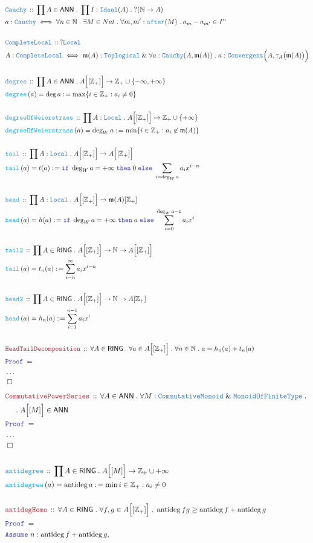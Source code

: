 \documentclass[12pt]{scrartcl}
\newcommand{\TYPE}[1]{\textcolor{NavyBlue}{\mathtt{#1}}}
\newcommand{\FUNC}[1]{\textcolor{Cerulean}{\mathtt{#1}}}
\newcommand{\LOGIC}[1]{\textcolor{Blue}{\mathtt{#1}}}
\newcommand{\THM}[1]{\textcolor{Maroon}{\mathtt{#1}}}
\renewcommand{\.}{\; . \;}
\newcommand{\de}{: \kern 0.1pc =}
\newcommand{\If}{\LOGIC{if} \;}
\newcommand{\Then}{ \; \LOGIC{then} \;}
\newcommand{\Else}{\; \LOGIC{else} \;}
\newcommand{\Act}[1]{\left( #1 \right)}
\newcommand{\Theorem}[2]{& \THM{#1} \, :: \, #2 \\ & \Proof = \\ }
\newcommand{\DeclareType}[2]{& \TYPE{#1} \, :: \, #2 \\}
\newcommand{\DefineType}[3]{& #1 : \TYPE{#2} \iff #3 \\}
\newcommand{\DeclareFunc}[2]{& \FUNC{#1} \, :: \, #2 \\}
\newcommand{\DefineNamedFunc}[4]{&  \FUNC{#1}\Act{#2} = #3 \de #4 \\}
\newcommand{\NewLine}{\\ & \kern 1pc}
\newcommand{\Page}[1]{ \begin{align*} #1 \end{align*}   }
\newcommand{\NoProof}{ & \ldots \\ \EndProof}
\renewcommand{\And}{\; \& \;}
\newcommand{\Int}{\mathbb{Z} }
\newcommand{\Nat}{\mathbb{N} }
\newcommand{\Assume}[2]{& \LOGIC{Assume} \; #1 : #2, \\}
\newcommand{\QED}{\; \square}
\newcommand{\EndProof}{& \QED \\}
\newcommand{\Proof}{\LOGIC{Proof} \; }
\newcommand{\Ideal}{\TYPE{Ideal}}
\newcommand{\MoFT}{\TYPE{MonoidOfFiniteType}}
\newcommand{\RING}{\mathsf{RING}}
\newcommand{\ANN}{\mathsf{ANN}}
\DeclareMathOperator{\antideg}{antideg}
\begin{document}
\Page{
	\DeclareType{Cauchy}{\prod A \in \ANN \. \prod I : \Ideal(A) \.?(\Nat \to A)}
	\DefineType{a}{Cauchy}{\forall n \in \Nat \. \exists M \in Nat \. \forall m,m' : \FUNC{after}(M) \. a_m - a_{m'} \in I^n}
	\\
	\DeclareType{CompleteLocal}{?\TYPE{Local}}
	\DefineType{A}{CompleteLocal}{\mathfrak{m}(A) : \TYPE{Toplogical} 
		\And \forall a : \TYPE{Cauchy}(A,\mathfrak{m}(A)) \. a : \TYPE{Convergent}\Big(A,\tau_A\big(\mathfrak{m}(A)\big)\Big)}
	\\
	\DeclareFunc{degree}{\prod A \in \ANN \. A\Big[[ \Int_+ ]\Big] \to \Int_+ \cup \{-\infty,+\infty \}}
	\DefineNamedFunc{degree}{a}{\deg a}{\max \{ i \in \Int_+ : a_i \neq 0\}}
	\\
	\DeclareFunc{degreeOfWeierstrass}{\prod A : \TYPE{Local} \. A\Big[[\Int_+]\Big] \to \Int_+ \cup \{+\infty \} }
	\DefineNamedFunc{degreeOfWeierstrass}{a}{\deg_W a}{\min \{ i \in \Int_+ : a_i \not \in \mathfrak{m}(A)   \}}
	\\
	\DeclareFunc{tail}{\prod A : \TYPE{Local} \. A\Big[[\Int_+]\Big] \to A\Big[[\Int_+]\Big] }
	\DefineNamedFunc{tail}{a}{t(a)}{\If \deg_W a = +\infty \Then 0 \Else \sum_{i = \deg_W a} a_ix^{i-n}}
	\\
	\DeclareFunc{head}{\prod A : \TYPE{Local} \. A\Big[[\Int_+]\Big] \to \mathfrak{m}(A)[\Int_+]}
	\DefineNamedFunc{head}{a}{h(a)}{\If \deg_W a = + \infty \Then a \Else \sum^{\deg_W a - 1}_{i=0} a_i x^i}
	\\
	\DeclareFunc{tail2}{\prod A \in \RING \. A\Big[[\Int_+]\Big] \to \Nat \to A\Big[[\Int_+]\Big] }
	\DefineNamedFunc{tail}{a}{t_n(a)}{ \sum^\infty_{i = n} a_ix^{i-n}}
	\\
	\DeclareFunc{head2}{\prod A \in \RING \. A\Big[[\Int_+]\Big] \to \Nat \to  A[\Int_+]}
	\DefineNamedFunc{head}{a}{h_n(a)}{ \sum^{n - 1}_{i=1} a_i x^i}
	\\
	\Theorem{HeadTailDecomposition}{\forall A \in \RING \. \forall a \in A\Big[[\Int_+]\Big] \. \forall n \in \Nat \. a = h_n(a) + t_n(a)}
	\NoProof
}\Page{
	\Theorem{CommutativePowerSeries}{\forall A \in \ANN \. \forall M : \TYPE{CommutativeMonoid} \And \MoFT \. \NewLine \. A\Big[[M]\Big] \in \ANN}
	\NoProof
	\\
	\DeclareFunc{antidegree}{\prod A \in \RING \. A\Big[[M]\Big] \to \Int_+ \cup {+\infty}}
	\DefineNamedFunc{antidegree}{a}{\antideg a}{\min{i \in \Int_+ : a_i \neq 0}}
	\\
	\Theorem{antidegHomo}{\forall A \in \RING \. \forall f,g \in A\Big[[\Int_+]\Big] \. \antideg fg \ge \antideg f + \antideg g  }
	\Assume{n}{\antideg f + \antideg g}
}
\end{document}
